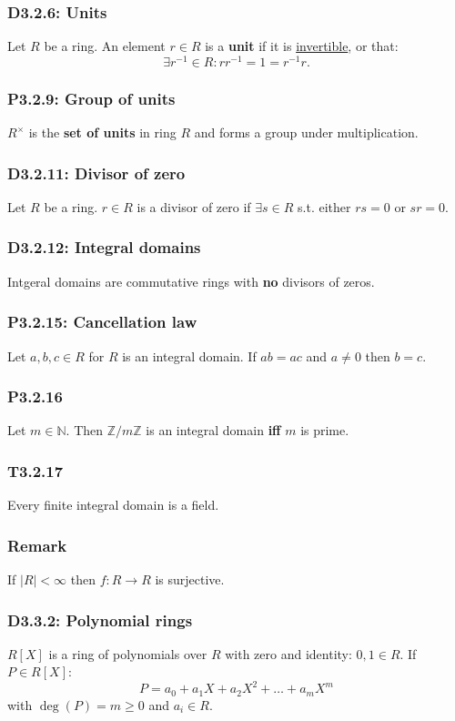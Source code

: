 \documentclass{article}
\begin{document}
\begin{multicols*}{3}
\subsubsection*{D3.2.6: Units}
Let $R$ be a ring. An element $r\in R$
is a \textbf{unit} if it is \underline{invertible}, or that:
$$\exists r^{-1}\in R: rr^{-1}=1=r^{-1}r.$$

\subsubsection*{P3.2.9: Group of units}
$R^{\times}$ is the \textbf{set of units} in ring $R$
and forms a group under multiplication.

\subsubsection*{D3.2.11: Divisor of zero}
Let $R$ be a ring. $r\in R$ is a divisor of zero
if $\exists s\in R$ s.t. either $rs=0$ or $sr=0$.

\subsubsection*{D3.2.12: Integral domains}
Intgeral domains are commutative rings
with \textbf{no} divisors of zeros.

\subsubsection*{P3.2.15: Cancellation law}
Let $a,b,c\in R$ for $R$ is an integral domain.
If $ab=ac$ and $a\neq0$ then $b=c$.

\subsubsection*{P3.2.16}
Let $m\in\mathbb{N}$. Then $\mathbb{Z}/m\mathbb{Z}$ 
is an integral domain \textbf{if{}f} $m$ is prime.

\subsubsection*{T3.2.17}
Every finite integral domain is a field.

\subsubsection*{Remark}
If $|R|<\infty$ then $f:R\rightarrow R$ is surjective.

\subsubsection*{D3.3.2: Polynomial rings}
$R[X]$ is a ring of polynomials over $R$ 
with zero and identity: $0,1\in R$. If $P\in R[X]$:
$$P=a_0+a_1 X+a_2 X^2+\dots+a_m X^m$$
with $\deg(P)=m\geq0$ and $a_i\in R$.


\end{multicols*}
\end{document}

